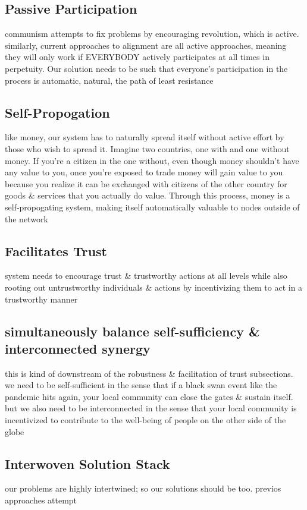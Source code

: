 \documentclass{article}
\begin{document}
\subsection{Passive Participation}
communism attempts to fix problems by encouraging revolution, which is active. similarly, current approaches to alignment are all active approaches, meaning they will only work if EVERYBODY actively participates at all times in perpetuity. Our solution needs to be such that everyone's participation in the process is automatic, natural, the path of least resistance

\subsection{Self-Propogation}
like money, our system has to naturally spread itself without active effort by those who wish to spread it. Imagine two countries, one with and one without money. If you're a citizen in the one without, even though money shouldn't have any value to you, once you're exposed to trade money will gain value to you because you realize it can be exchanged with citizens of the other country for goods \& services that you actually do value. Through this process, money is a self-propogating system, making itself automatically valuable to nodes outside of the network

\subsection{Facilitates Trust}
system needs to encourage trust \& trustworthy actions at all levels while also rooting out untrustworthy individuals \& actions by incentivizing them to act in a trustworthy manner

\subsection{simultaneously balance self-sufficiency \& interconnected synergy}
this is kind of downstream of the robustness \& facilitation of trust subsections. we need to be self-sufficient in the sense that if a black swan event like the pandemic hits again, your local community can close the gates \& sustain itself. but we also need to be interconnected in the sense that your local community is incentivized to contribute to the well-being of people on the other side of the globe

\subsection{Interwoven Solution Stack}
our problems are highly intertwined; so our solutions should be too. previos approaches attempt 
\end{document}
